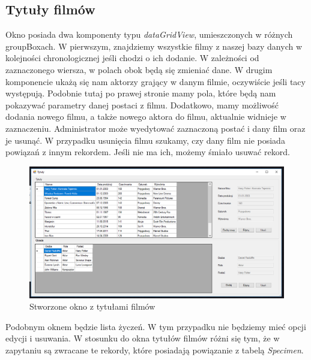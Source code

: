 \documentclass{article}
\begin{document}
\subsection{Tytuły filmów}
Okno posiada dwa komponenty typu \textit{dataGridView}, umieszczonych w różnych groupBoxach. W pierwszym, znajdziemy wszystkie filmy z naszej bazy danych w kolejności chronologicznej jeśli chodzi o ich dodanie. W zależności od zaznaczonego wiersza, w polach obok będą się zmieniać dane. W drugim komponencie ukażą się nam aktorzy grający w danym filmie, oczywiście jeśli tacy występują. Podobnie tutaj po prawej stronie mamy pola, które będą nam pokazywać parametry danej postaci z filmu. Dodatkowo, mamy możliwość dodania nowego filmu, a także nowego aktora do filmu, aktualnie widnieje w zaznaczeniu. Administrator może wyedytować zaznaczoną postać i dany film oraz je usunąć. W przypadku usunięcia filmu szukamy, czy dany film nie posiada powiązań z innym rekordem. Jeśli nie ma ich, możemy śmiało usuwać rekord. 
\begin{figure}[!ht]
\centering
\includegraphics[width=12.5cm]{tytuly.PNG}
\caption{Stworzone okno z tytułami filmów}
\end{figure}

Podobnym oknem będzie lista życzeń. W tym przypadku nie będziemy mieć opcji edycji i usuwania. W stosunku do okna tytułów filmów różni się tym, że w zapytaniu są zwracane te rekordy, które posiadają powiązanie z tabelą \textit{Specimen}.
\end{document}
